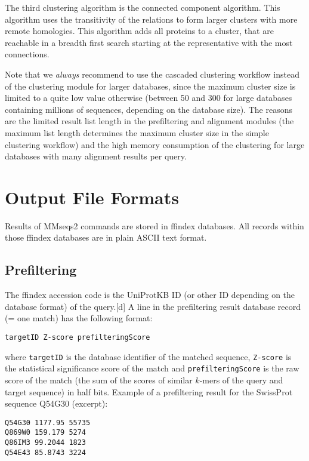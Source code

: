 \documentclass[11pt,a4paper]{scrreprt}
\begin{document}
The third clustering algorithm is the connected component algorithm. This algorithm uses the transitivity of the relations to form larger clusters with more remote homologies. This algorithm adds all proteins to a cluster, that are reachable in a breadth first search starting at the representative with the most connections.


Note that we \emph{always} recommend to use the cascaded clustering workflow instead of the clustering module for larger databases, since the maximum cluster size is limited to a quite low value otherwise (between 50 and 300 for large databases containing millions of sequences, depending on the database size). The reasons are the limited result list length in the prefiltering and alignment modules (the maximum list length determines the maximum cluster size in the simple clustering workflow) and the high memory consumption of the clustering for large databases with many alignment results per query.


\section{Output File Formats}
Results of MMseqs2 commands are stored in ffindex databases. All records within those ffindex databases are in plain ASCII text format. 
\subsection{Prefiltering}
The ffindex accession code is the UniProtKB ID (or other ID depending on the database format) of the query.[d] A line in the prefiltering result database record (= one match) has the following format:


\begin{verbatim}
targetID Z-score prefilteringScore
\end{verbatim}


where \texttt{targetID} is the database identifier of the matched sequence, \texttt{Z-score} is the statistical significance score of the match and \texttt{prefilteringScore} is the raw score of the match (the sum of the scores of similar $k$-mers of the query and target sequence) in half bits. Example of a prefiltering result for the SwissProt sequence Q54G30 (excerpt):


\begin{verbatim}
Q54G30 1177.95 55735
Q869W0 159.179 5274
Q86IM3 99.2044 1823
Q54E43 85.8743 3224
\end{verbatim}
\end{document}
